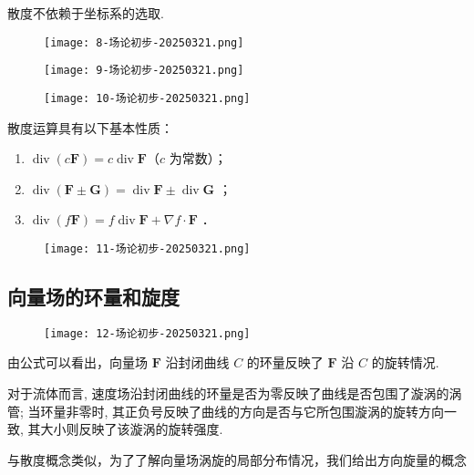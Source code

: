 散度不依赖于坐标系的选取.

\begin{figure}[H]
\centering
\texttt{[image: 8-场论初步-20250321.png]}
\label{}
\end{figure}

\begin{figure}[H]
\centering
\texttt{[image: 9-场论初步-20250321.png]}
\label{}
\end{figure}

\begin{figure}[H]
\centering
\texttt{[image: 10-场论初步-20250321.png]}
\label{}
\end{figure}

散度运算具有以下基本性质：

\begin{enumerate}
	\item $\operatorname{div}(c \boldsymbol{F})=c \operatorname{div} \boldsymbol{F}$（$c$ 为常数）；
	\item $\operatorname{div}(\boldsymbol{F} \pm \boldsymbol{G})=\operatorname{div} \boldsymbol{F} \pm \operatorname{div} \boldsymbol{G}$ ；
	\item $\operatorname{div}(f \boldsymbol{F})=f \operatorname{div} \boldsymbol{F}+\nabla f \cdot \boldsymbol{F}$ ．
\end{enumerate}

\begin{figure}[H]
\centering
\texttt{[image: 11-场论初步-20250321.png]}
\label{}
\end{figure}

\subsection{向量场的环量和旋度}

\begin{figure}[H]
\centering
\texttt{[image: 12-场论初步-20250321.png]}
\label{}
\end{figure}

由公式可以看出，向量场 $\boldsymbol{F}$ 沿封闭曲线 $C$ 的环量反映了 $\boldsymbol{F}$ 沿 $C$ 的旋转情况.

对于流体而言, 速度场沿封闭曲线的环量是否为零反映了曲线是否包围了漩涡的涡管; 当环量非零时, 其正负号反映了曲线的方向是否与它所包围漩涡的旋转方向一致, 其大小则反映了该漩涡的旋转强度.

与散度概念类似，为了了解向量场涡旋的局部分布情况，我们给出方向旋量的概念

